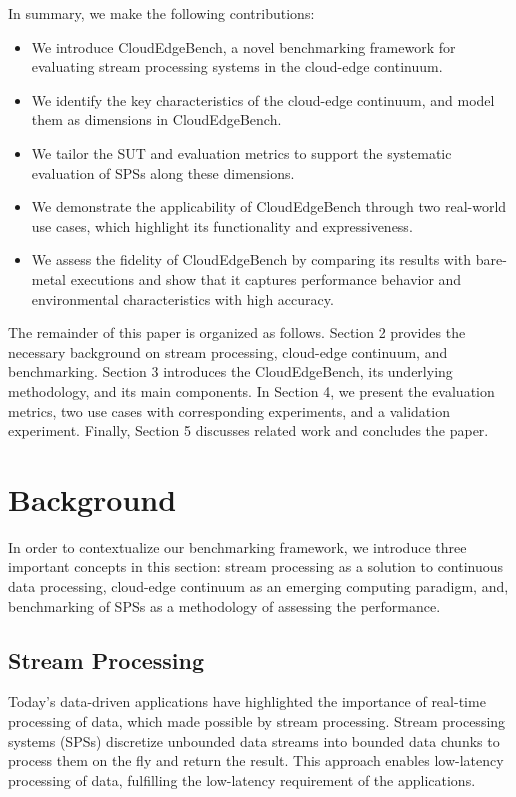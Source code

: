 \documentclass[runningheads]{llncs}
\begin{document}
In summary, we make the following contributions:
\begin{itemize}
    \item We introduce CloudEdgeBench, a novel benchmarking framework for evaluating stream processing systems in the cloud-edge continuum. 
    \item We identify the key characteristics of the cloud-edge continuum, and model them as dimensions in CloudEdgeBench.
    \item We tailor the SUT and evaluation metrics to support the systematic evaluation of SPSs along these dimensions.
    \item We demonstrate the applicability of CloudEdgeBench through two real-world use cases, which highlight its functionality and expressiveness. %
    \item We assess the fidelity of CloudEdgeBench by comparing its results with bare-metal executions and show that it captures performance behavior and environmental characteristics with high accuracy.
\end{itemize}
The remainder of this paper is organized as follows.
Section 2 provides the necessary background on stream processing, cloud-edge continuum, and benchmarking.
Section 3 introduces the CloudEdgeBench, its underlying methodology, and its main components. 
In Section 4, we present the evaluation metrics, two use cases with corresponding experiments, and a validation experiment.
Finally, Section 5 discusses related work and concludes the paper.

\section{Background} \label{sec:background}

In order to contextualize our benchmarking framework, we introduce three important concepts in this section: stream processing as a solution to continuous data processing, cloud-edge continuum as an emerging computing paradigm, and, benchmarking of SPSs as a methodology of assessing the performance.

\subsection{Stream Processing}
Today's data-driven applications have highlighted the importance of real-time processing of data, which made possible by stream processing.
Stream processing systems (SPSs) discretize unbounded data streams into bounded data chunks to process them on the fly and return the result.
This approach enables low-latency processing of data, fulfilling the low-latency requirement of the applications.
\end{document}

